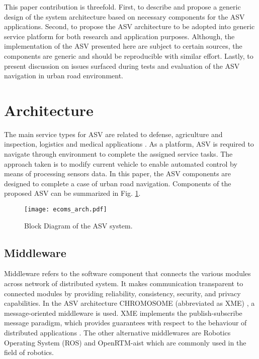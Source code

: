 \documentclass[10 pt,a4paper,conference]{IEEEtran}
\begin{document}
This paper contribution is threefold. First, to describe and propose a
generic design of the system architecture based on necessary components
for the ASV applications. Second, to propose the ASV architecture to be
adopted into generic service platform for both research and application
purposes. Although, the implementation of the ASV presented here are
subject to certain sources, the components are generic and should be
reproducible with similar effort. Lastly, to present discussion on
issues surfaced during tests and evaluation of the ASV navigation in
urban road environment.

\section{Architecture}\label{architecture}

The main service types for ASV are related to defense, agriculture and
inspection, logistics and medical applications \citep{SVR_Nov_15}. As a
platform, ASV is required to navigate through environment to complete
the assigned service tasks. The approach taken is to modify current
vehicle to enable automated control by means of processing sensors data.
In this paper, the ASV components are designed to complete a case of
urban road navigation. Components of the proposed ASV can be summarized
in Fig. \ref{fig_1}.

\begin{figure}[!t]
\centering
\texttt{[image: ecoms\_arch.pdf]}
\caption{Block Diagram of the ASV system.}
\label{fig_1}
\end{figure}

\subsection{Middleware}\label{middleware}

Middleware refers to the software component that connects the various
modules across network of distributed system. It makes communication
transparent to connected modules by providing reliability, consistency,
security, and privacy capabilities. In the ASV architecture CHROMOSOME
(abbreviated as XME) \citep{CHROMOSOME}, a message-oriented middleware
is used. XME implements the publish-subscribe message paradigm, which
provides guarantees with respect to the behaviour of distributed
applications \citep{buckl2014chromosome}. The other alternative
middlewares are Robotics Operating System (ROS) \citep{quigley2009ros}
and OpenRTM-aist \citep{ando2005rt} which are commonly used in the field
of robotics.
\end{document}
